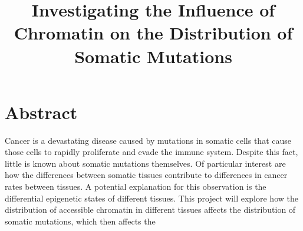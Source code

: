 \documentclass[12pt]{article}
\title{Investigating the Influence of Chromatin on the Distribution of Somatic Mutations}
\date{}
\begin{document}
\maketitle







\section{Abstract}
Cancer is a devastating disease caused by mutations in somatic cells that cause those cells to rapidly proliferate and evade the immune system.
Despite this fact, little is known about somatic mutations themselves.
Of particular interest are how the differences between somatic tissues contribute to differences in cancer rates between tissues.
A potential explanation for this observation is the differential epigenetic states of different tissues.
This project will explore how the distribution of accessible chromatin in different tissues affects the distribution of somatic mutations, which then affects the 
\end{document}
